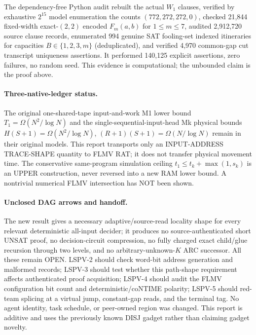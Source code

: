 \documentclass[11pt]{article}
\begin{document}
The dependency-free Python audit rebuilt the actual $W_1$ clauses, verified by exhaustive $2^{15}$ model enumeration the counts $(772,272,272,0)$, checked 21,844 fixed-width exact-$(2,2)$ encoded $F_m(a,b)$ for $1\le m\le7$, audited 2,912,720 source clause records, enumerated 994 genuine SAT fooling-set indexed itineraries for capacities $B\in\{1,2,3,m\}$ (deduplicated), and verified 4,970 common-gap cut transcript uniqueness assertions. It performed 140,125 explicit assertions, zero failures, no random seed. This evidence is computational; the unbounded claim is the proof above.

\paragraph{Three-native-ledger status.}
The original one-shared-tape input-and-work M1 lower bound $T_1=\Omega(N^2/\log N)$ and the single-sequential-input-head Mk physical bounds $H(S+1)=\Omega(N^2/\log N)$, $(R+1)(S+1)=\Omega(N/\log N)$ remain in their original models. This report transports only an INPUT-ADDRESS TRACE-SHAPE quantity to FLMV RAT; it does not transfer physical movement time. The conservative same-program simulation ceiling $t_1\le t_k+\max(1,s_k)$ is an UPPER construction, never reversed into a new RAM lower bound. A nontrivial numerical FLMV intersection has NOT been shown.

\paragraph{Unclosed DAG arrows and handoff.}
The new result gives a necessary adaptive/source-read locality shape for every relevant deterministic all-input decider; it produces no source-authenticated short UNSAT proof, no decision-circuit compression, no fully charged exact child/glue recursion through two levels, and no arbitrary-unknown-$K$ ARC successor. All these remain OPEN. LSPV-2 should check word-bit address generation and malformed records; LSPV-3 should test whether this path-shape requirement affects authenticated proof acquisition; LSPV-4 should audit the FLMV configuration bit count and deterministic/coNTIME polarity; LSPV-5 should red-team splicing at a virtual jump, constant-gap reads, and the terminal tag. No agent identity, task schedule, or peer-owned region was changed. This report is additive and uses the previously known DISJ gadget rather than claiming gadget novelty.
\end{document}
